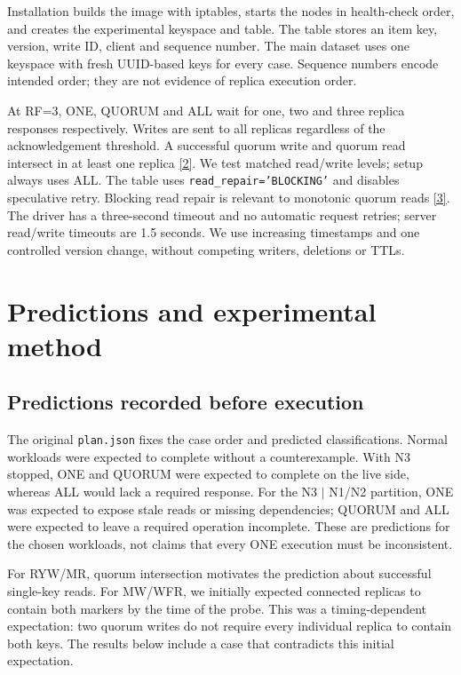 \documentclass[lang=en,11pt,a4paper,bibend=bibtex]{elegantpaper}
\begin{document}
Installation builds the image with iptables, starts the nodes in health-check order, and creates the experimental keyspace and table. The table stores an item key, version, write ID, client and sequence number. The main dataset uses one keyspace with fresh UUID-based keys for every case. Sequence numbers encode intended order; they are not evidence of replica execution order.

At RF=3, ONE, QUORUM and ALL wait for one, two and three replica responses respectively. Writes are sent to all replicas regardless of the acknowledgement threshold. A successful quorum write and quorum read intersect in at least one replica \hyperref[ref:2]{[2]}. We test matched read/write levels; setup always uses ALL. The table uses \texttt{read\_repair='BLOCKING'} and disables speculative retry. Blocking read repair is relevant to monotonic quorum reads \hyperref[ref:3]{[3]}. The driver has a three-second timeout and no automatic request retries; server read/write timeouts are 1.5 seconds. We use increasing timestamps and one controlled version change, without competing writers, deletions or TTLs.

\section{Predictions and experimental method}
\subsection{Predictions recorded before execution}
The original \texttt{plan.json} fixes the case order and predicted classifications. Normal workloads were expected to complete without a counterexample. With N3 stopped, ONE and QUORUM were expected to complete on the live side, whereas ALL would lack a required response. For the N3 $|$ N1/N2 partition, ONE was expected to expose stale reads or missing dependencies; QUORUM and ALL were expected to leave a required operation incomplete. These are predictions for the chosen workloads, not claims that every ONE execution must be inconsistent.

For RYW/MR, quorum intersection motivates the prediction about successful single-key reads. For MW/WFR, we initially expected connected replicas to contain both markers by the time of the probe. This was a timing-dependent expectation: two quorum writes do not require every individual replica to contain both keys. The results below include a case that contradicts this initial expectation.
\end{document}
